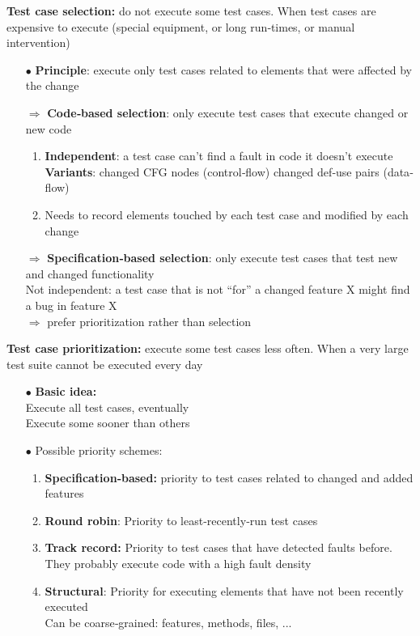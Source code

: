 \documentclass{article}
\begin{document}
\begin{multicols}{2}
\noindent \textbf{Test
case
selection:} do
not
execute
some
test
cases.
When
test
cases
are
expensive
to
execute
(special
equipment,
or
long
run‐times,
or
manual
intervention)
\begin{itemize}
    \item [$\bullet$]\textbf{Principle}:
execute
only
test
cases
related
to
elements
that
were
affected
by
the
change\\
    \item [$\Rightarrow$]\textbf{Code‐based
selection}:
only
execute
test
cases
that
execute
changed
or
new
code
\begin{enumerate}
    \item \textbf{Independent}:
a
test
case
can’t
find
a
fault
in
code
it
doesn’t
execute\\
\textbf{Variants}:
changed
CFG
nodes
(control‐flow)
changed
def‐use
pairs
(data‐flow)
    \item Needs
to
record
elements
touched
by
each
test
case
and
modified
by
each
change
\end{enumerate}


    \item [$\Rightarrow$]\textbf{Specification‐based selection}:
only
execute
test
cases
that
test
new
and
changed
functionality\\
Not
independent:
a
test
case
that
is
not
“for”
a
changed
feature
X
might
find
a
bug
in
feature
X\\
$\Rightarrow$ prefer
prioritization rather
than
selection

\end{itemize}

\vfill\null\columnbreak
\noindent \textbf{Test
case
prioritization:}
execute
some
test
cases
less
often.
When
a
very
large
test
suite
cannot
be
executed
every
day
\begin{itemize}
    \item [$\bullet$]\textbf{Basic
idea:}\\
Execute
all test
cases,
eventually
\\Execute
some
sooner
than
others
    \item [$\bullet$]Possible
priority
schemes:
\begin{enumerate}
    \item \textbf{Specification‐based:}
priority
to
test
cases
related
to
changed
and
added
features
    \item \textbf{Round
robin}:
Priority
to
least‐recently‐run
test
cases
    \item \textbf{Track
record:}
Priority
to
test
cases
that
have
detected
faults
before.
They
probably
execute
code
with
a
high
fault
density
    \item \textbf{Structural}:
Priority
for
executing
elements
that
have
not
been
recently
executed\\
Can
be
coarse‐grained:
features,
methods,
files,
...
\end{enumerate}
\end{itemize}
\vfill\null
\end{multicols}
\end{document}
